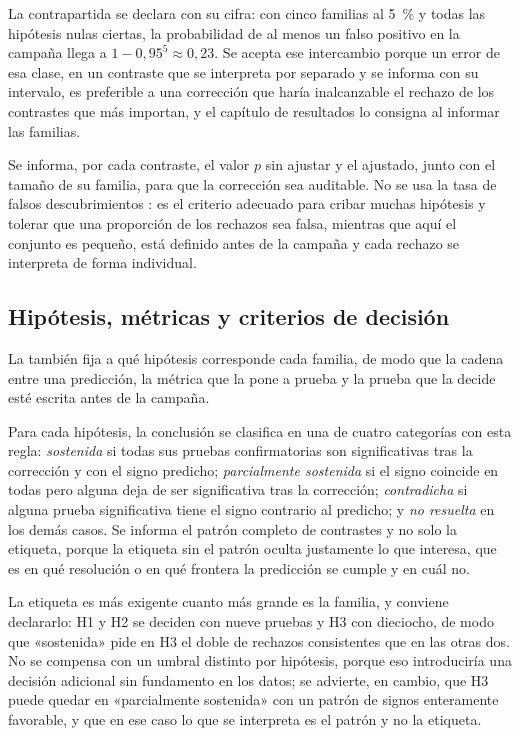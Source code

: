 La contrapartida se declara con su cifra: con cinco familias al 5~\% y todas
las hipótesis nulas ciertas, la probabilidad de al menos un falso positivo en
la campaña llega a $1-0{,}95^{5}\approx0{,}23$. Se acepta ese intercambio
porque un error de esa clase, en un contraste que se interpreta por separado y
se informa con su intervalo, es preferible a una corrección que haría
inalcanzable el rechazo de los contrastes que más importan, y el capítulo de
resultados lo consigna al informar las familias.

Se informa, por cada contraste, el valor $p$ sin ajustar y el ajustado, junto
con el tamaño de su familia, para que la corrección sea auditable. No se usa
la tasa de falsos descubrimientos \cite{benjamini1995}: es el criterio adecuado
para cribar muchas
hipótesis y tolerar que una proporción de los rechazos sea falsa, mientras que
aquí el conjunto es pequeño, está definido antes de la campaña y cada rechazo
se interpreta de forma individual.

\subsection{Hipótesis, métricas y criterios de decisión}
\label{sec:analysis-hypotheses}

La  también fija a qué hipótesis corresponde cada
familia, de modo que la cadena entre una predicción, la métrica que la pone a
prueba y la prueba que la decide esté escrita antes de la campaña.

Para cada hipótesis, la conclusión se clasifica en una de cuatro categorías con
esta regla: \emph{sostenida} si todas sus pruebas confirmatorias son
significativas tras la corrección y con el signo predicho; \emph{parcialmente
sostenida} si el signo coincide en todas pero alguna deja de ser significativa
tras la corrección; \emph{contradicha} si alguna prueba significativa tiene el
signo contrario al predicho; y \emph{no resuelta} en los demás casos. Se
informa el patrón completo de contrastes y no solo la etiqueta, porque la
etiqueta sin el patrón oculta justamente lo que interesa, que es en qué
resolución o en qué frontera la predicción se cumple y en cuál no.

La etiqueta es más exigente cuanto más grande es la familia, y conviene
declararlo: H1 y H2 se deciden con nueve pruebas y H3 con dieciocho, de modo
que «sostenida» pide en H3 el doble de rechazos consistentes que en las otras
dos. No se compensa con un umbral distinto por hipótesis, porque eso
introduciría una decisión adicional sin fundamento en los datos; se advierte,
en cambio, que H3 puede quedar en «parcialmente sostenida» con un patrón de
signos enteramente favorable, y que en ese caso lo que se interpreta es el
patrón y no la etiqueta.

